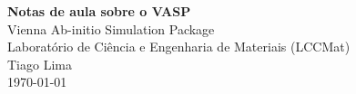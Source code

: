 \documentclass[12pt]{article}
\newcommand{\titulo}{Notas de aula sobre o VASP}
\newcommand{\subtitle}{Vienna Ab-initio Simulation Package}
\newcommand{\autor}{Tiago Lima}
\newcommand{\lab}{Laboratório de Ciência e Engenharia de Materiais (LCCMat)}
\begin{document}
\begin{center}
	\thispagestyle{empty}
  {\LARGE\bfseries \titulo}\\[.5em]
  {\large \subtitle}\\[.5em]
  {\lab}\\[2.5em]
  {\autor}\\[0.5em]
  {\today}\\[2.0em]
\end{center}

\begin{abstract}
  Relatório de notas de aula sobre o VASP, incluindo instruções de uso, funcionalidades dos arquivos
  de entrada e saída, bem como exemplos de cálculos e análises de resultados. O objetivo é fornecer
  um guia prático para pesquisadores e alunos do LCCMat que desejam utilizar o VASP em seus estudos
  de materiais.
\end{abstract}

\tableofcontents
\newpage



\clearpage
\printbibliography
\end{document}
